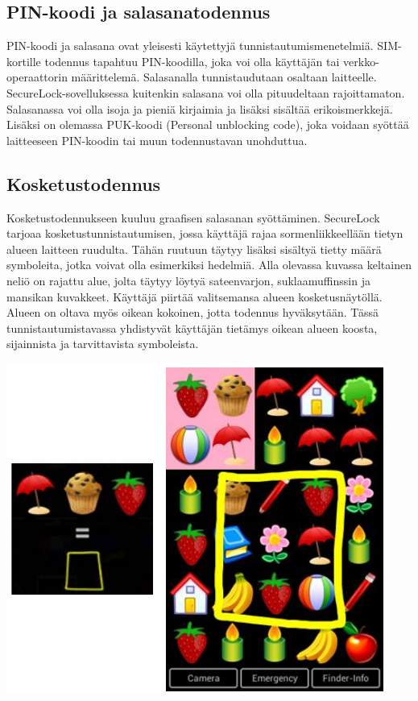 \documentclass[finnish]{tktltiki2}
\theoremstyle{definition}
\theoremstyle{remark}
\begin{document}
\subsection{PIN-koodi ja salasanatodennus}

PIN-koodi ja salasana ovat yleisesti käytettyjä tunnistautumismenetelmiä. SIM-kortille todennus tapahtuu PIN-koodilla, joka voi olla käyttäjän tai verkko-operaattorin määrittelemä. Salasanalla tunnistaudutaan osaltaan laitteelle. SecureLock-sovelluksessa kuitenkin salasana voi olla pituudeltaan rajoittamaton. Salasanassa voi olla isoja ja pieniä kirjaimia ja lisäksi sisältää erikoismerkkejä.   Lisäksi on olemassa PUK-koodi (Personal unblocking code), joka voidaan syöttää laitteeseen PIN-koodin tai muun todennustavan unohduttua.

\subsection{Kosketustodennus}

Kosketustodennukseen kuuluu graafisen salasanan syöttäminen. SecureLock tarjoaa kosketustunnistautumisen, jossa käyttäjä rajaa sormenliikkeellään tietyn alueen laitteen ruudulta. Tähän ruutuun täytyy lisäksi sisältyä tietty määrä symboleita, jotka voivat olla esimerkiksi hedelmiä. Alla olevassa kuvassa keltainen neliö on rajattu alue, jolta täytyy löytyä sateenvarjon, suklaamuffinssin ja mansikan kuvakkeet. Käyttäjä piirtää valitsemansa alueen kosketusnäytöllä. Alueen on oltava myös oikean kokoinen, jotta todennus hyväksytään. Tässä tunnistautumistavassa yhdistyvät käyttäjän tietämys oikean alueen koosta, sijainnista ja tarvittavista symboleista.

\includegraphics[scale=0.5]{gesture}
\end{document}
